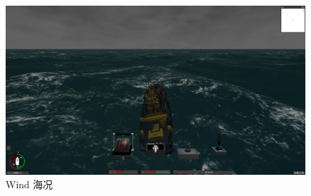 \documentclass[a4paper,10pt]{article}
\begin{document}
		\begin{figure}[htbp]
			\centering				
			\includegraphics[width=\columnwidth]{picture/Wind}
			\caption{
				\label{fig: Wind1} 
				Wind 海况
			}	
		\end{figure}

	
	
\end{document}
